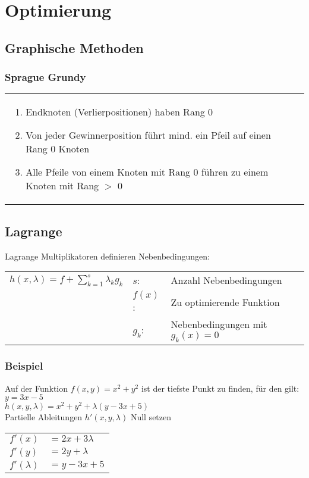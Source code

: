 \section{Optimierung}
\subsection{Graphische Methoden}
\subsubsection{Sprague Grundy}
\begin{tabularx}{\textwidth}{XX}
	\vspace{-4cm}
\begin{enumerate}
	\item Endknoten (Verlierpositionen) haben Rang 0
	\item Von jeder Gewinnerposition führt mind. ein Pfeil auf einen Rang 0 Knoten
	\item Alle Pfeile von einem Knoten mit Rang 0 führen zu einem Knoten mit Rang $>$ 0
\end{enumerate} &

\end{tabularx}

\subsection{Lagrange}
Lagrange Multiplikatoren definieren Nebenbedingungen:\\
\begin{tabular}{l l l}
	{$ h(x,\lambda) = f + \sum\limits_{k=1}^s{\lambda_k g_k} $ } &
		$s$:    &Anzahl Nebenbedingungen \\
		&$f(x)$:&Zu optimierende Funktion \\
		&$g_k$: &Nebenbedingungen mit $g_k(x) = 0$
\end{tabular}
\subsubsection{Beispiel}
Auf der Funktion $f(x,y) = x^2 + y^2$ ist der tiefste Punkt zu finden,
für den gilt: $y = 3x - 5$ \\
$ h(x,y,\lambda) = x^2 + y^2 + \lambda(y - 3x + 5) $ \\
Partielle Ableitungen $h'(x,y,\lambda)$ Null setzen
\begin{tabular}{ll}
	$f'(x)$&$ = 2 x + 3 \lambda$ \\
	$f'(y)$&$ = 2 y + \lambda$ \\
	$f'(\lambda)$&$ = y - 3x + 5$
\end{tabular}

